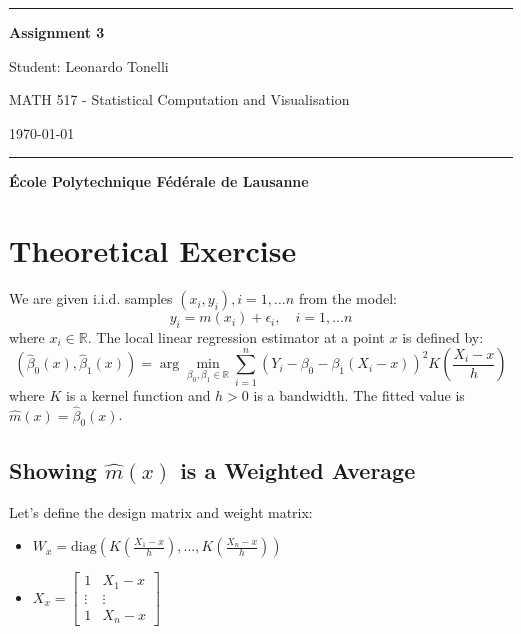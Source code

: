 \documentclass{article}
\title{}
\author{}
\date{}
\begin{document}
\begin{titlepage}
\centering
    \vspace*{4cm}
    
    \rule{\textwidth}{1pt}
    \vspace{0.2cm}
    
    {\LARGE\bfseries Assignment 3}
    
    \vspace{0.3cm} %
    
    {\Large Student: Leonardo Tonelli}
    
    \vspace{0.2cm} %
    
    {\Large MATH 517 - Statistical Computation and Visualisation}
    
    \vspace{0.3cm} %
    
    {\large \today}
    
    \vspace{0.2cm}
    
    \rule{\textwidth}{1pt}

    \vspace{10cm}

    {\large \textbf{École Polytechnique Fédérale de Lausanne}} 
    
\end{titlepage}

\section{Theoretical Exercise}

We are given i.i.d. samples $(x_i, y_i), i=1, \ldots n$ from the model:
\[
y_i = m(x_i) + \epsilon_i, \quad i=1, \ldots n
\]
where $x_i \in \mathbb{R}$. The local linear regression estimator at a point $x$ is defined by:
\[
(\hat{\beta}_0(x), \hat{\beta}_1(x)) = \arg\min_{\beta_0,\beta_1 \in \mathbb{R}} \sum_{i=1}^n \left(Y_i - \beta_0 - \beta_1 (X_i - x)\right)^2 K\left(\frac{X_i - x}{h}\right)
\]
where $K$ is a kernel function and $h>0$ is a bandwidth. The fitted value is $\hat{m}(x) = \hat{\beta}_0(x)$.

\subsection{Showing $\hat{m}(x)$ is a Weighted Average}

Let's define the design matrix and weight matrix:
\begin{itemize}
    \item $W_x = \text{diag}\left(K\left(\frac{X_1 - x}{h}\right), \dots, K\left(\frac{X_n - x}{h}\right)\right)$
    \item $X_x = \begin{bmatrix} 1 & X_1 - x \\ \vdots & \vdots \\ 1 & X_n - x \end{bmatrix}$
\end{itemize}
\end{document}
